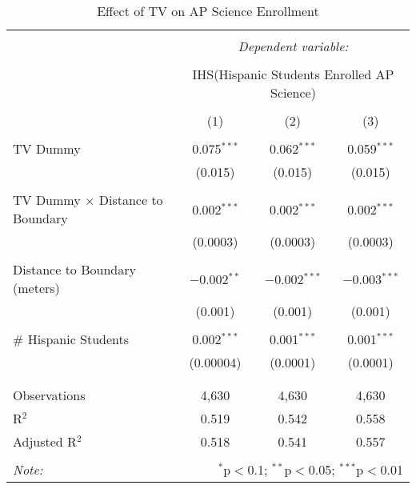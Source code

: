 
\begin{table}[!htbp] \centering 
  \caption{Effect of TV on AP Science Enrollment} 
  \label{} 
\begin{tabular}{@{\extracolsep{-2pt}}lccc} 
\\[-1.8ex]\hline 
\hline \\[-1.8ex] 
 & \multicolumn{3}{c}{\textit{Dependent variable:}} \\ 
\cline{2-4} 
\\[-1.8ex] & \multicolumn{3}{c}{IHS(Hispanic Students Enrolled AP Science)} \\ 
\\[-1.8ex] & (1) & (2) & (3)\\ 
\hline \\[-1.8ex] 
 TV Dummy & 0.075$^{***}$ & 0.062$^{***}$ & 0.059$^{***}$ \\ 
  & (0.015) & (0.015) & (0.015) \\ 
  & & & \\ 
 TV Dummy $\times$ Distance to Boundary & 0.002$^{***}$ & 0.002$^{***}$ & 0.002$^{***}$ \\ 
  & (0.0003) & (0.0003) & (0.0003) \\ 
  & & & \\ 
 Distance to Boundary (meters) & $-$0.002$^{**}$ & $-$0.002$^{***}$ & $-$0.003$^{***}$ \\ 
  & (0.001) & (0.001) & (0.001) \\ 
  & & & \\ 
 \# Hispanic Students & 0.002$^{***}$ & 0.001$^{***}$ & 0.001$^{***}$ \\ 
  & (0.00004) & (0.0001) & (0.0001) \\ 
  & & & \\ 
\hline \\[-1.8ex] 
Observations & 4,630 & 4,630 & 4,630 \\ 
R$^{2}$ & 0.519 & 0.542 & 0.558 \\ 
Adjusted R$^{2}$ & 0.518 & 0.541 & 0.557 \\ 
\hline 
\hline \\[-1.8ex] 
\textit{Note:}  & \multicolumn{3}{r}{$^{*}$p$<$0.1; $^{**}$p$<$0.05; $^{***}$p$<$0.01} \\ 
\end{tabular} 
\end{table} 
